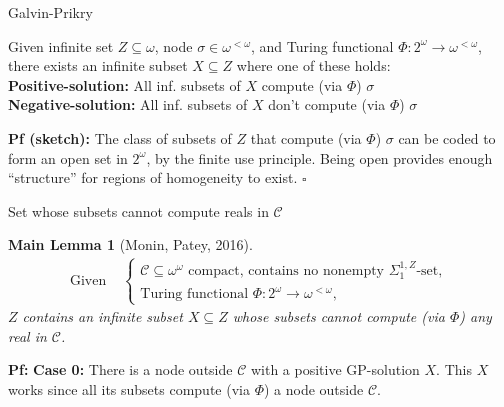 \begin{frame}{Galvin-Prikry}
  \begin{fact*}
    Given infinite set $Z\subseteq\omega$, node $\sigma\in\omega^{<\omega}$,
    and Turing functional $\Phi:2^\omega\rightarrow \omega^{<\omega}$,
    there exists an infinite subset $X\subseteq Z$ where one of these
    holds:\\

    \vspace{1em}
    \textbf{Positive-solution:} All inf. subsets of $X$ compute (via
    $\Phi$) $\sigma$ \\
    \textbf{Negative-solution:} All inf. subsets of $X$ don't compute (via
    $\Phi$) $\sigma$
  \end{fact*}

  \vspace{1em}
  \textbf{Pf (sketch):} The class of subsets of $Z$ that compute (via
  $\Phi$) $\sigma$ can be coded to form an open set in $2^\omega$, by the
  finite use principle. Being open provides enough ``structure'' for
  regions of homogeneity to exist. $\square$
\end{frame}

\begin{frame}{Set whose subsets cannot compute reals in $\mathcal{C}$}
  \newtheorem*{main-lemma*}{Main Lemma}
  \begin{main-lemma*}[Monin, Patey, 2016]
    \begin{align*}
      \text{Given } &\begin{cases}
        \mathcal{C}\subseteq\omega^\omega \text{ compact, contains
        no nonempty } \Sigma^{1,Z}_1\text{-set},\\
        \text{Turing functional } \Phi:2^{\omega}\rightarrow
        \omega^{<\omega},
      \end{cases}
    \end{align*}
    $Z$ contains an infinite subset $X\subseteq Z$ whose subsets cannot
    compute (via $\Phi$) any real in $\mathcal{C}$.
  \end{main-lemma*}

  \vspace{3em}
  \textbf{Pf:} \textbf{Case 0:} There is a node outside
  $\mathcal{C}$ with a positive GP-solution $X$. This $X$ works since
  all its subsets compute (via $\Phi$) a node outside $\mathcal{C}$.
\end{frame}

